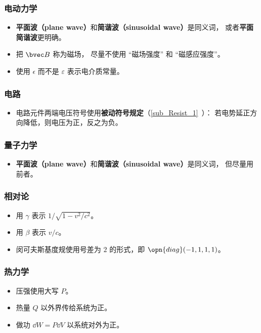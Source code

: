 \subsubsection{电动力学}
\begin{itemize}
\item \textbf{平面波（plane wave）}和\textbf{简谐波（sinusoidal wave）}是同义词， 或者\textbf{平面简谐波}更明确。
\item 把 $\bvec B$ 称为磁场， 尽量不使用 “磁场强度” 和 “磁感应强度”。
\item 使用 $\epsilon$ 而不是 $\varepsilon$ 表示电介质常量。
\end{itemize}

\subsubsection{电路}
\begin{itemize}
\item 电路元件两端电压符号使用\textbf{被动符号规定}（\autoref{sub_Resist_1}~）： 若电势延正方向降低，则电压为正，反之为负。
\end{itemize}

\subsubsection{量子力学}
\begin{itemize}
\item \textbf{平面波（plane wave）}和\textbf{简谐波（sinusoidal wave）}是同义词， 但尽量用前者。
\end{itemize}

\subsubsection{相对论}
\begin{itemize}
\item 用 $\gamma$ 表示 $1/\sqrt{1 - v^2/c^2}$。
\item 用 $\beta$ 表示 $v/c$。
\item 闵可夫斯基度规使用号差为 $2$ 的形式，即 $\opn{diag}(-1, 1, 1, 1)$。
\end{itemize}

\subsubsection{热力学}
\begin{itemize}
\item 压强使用大写 $P$。
\item 热量 $Q$ 以外界传给系统为正。
\item 做功 $\dd{W} = P\dd{V}$ 以系统对外为正。
\end{itemize}


